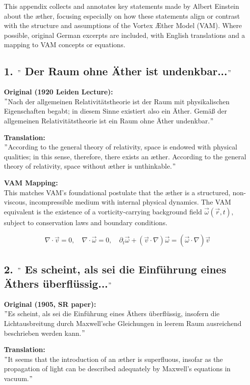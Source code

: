 This appendix collects and annotates key statements made by Albert Einstein about the æther, focusing especially on how these statements align or contrast with the structure and assumptions of the Vortex Æther Model (VAM). Where possible, original German excerpts are included, with English translations and a mapping to VAM concepts or equations.

\subsection*{1. \("\) Der Raum ohne Äther ist undenkbar...\("\)}
\textbf{Original (1920 Leiden Lecture):} \\
\("\)Nach der allgemeinen Relativitätstheorie ist der Raum mit physikalischen Eigenschaften begabt; in diesem Sinne existiert also ein Äther. Gemäß der allgemeinen Relativitätstheorie ist ein Raum ohne Äther undenkbar.\("\)

\textbf{Translation:} \\
\("\)According to the general theory of relativity, space is endowed with physical qualities; in this sense, therefore, there exists an æther. According to the general theory of relativity, space without æther is unthinkable.\("\)

\textbf{VAM Mapping:} \\
This matches VAM's foundational postulate that the æther is a structured, non-viscous, incompressible medium with internal physical dynamics. The VAM equivalent is the existence of a vorticity-carrying background field \( \vec{\omega}(\vec{r}, t) \), subject to conservation laws and boundary conditions.

\[
\nabla \cdot \vec{v} = 0, \quad \nabla \cdot \vec{\omega} = 0, \quad \partial_t \vec{\omega} + (\vec{v} \cdot \nabla) \vec{\omega} = (\vec{\omega} \cdot \nabla) \vec{v}
\]

\subsection*{2. \("\) Es scheint, als sei die Einführung eines Äthers überflüssig...\("\)}
\textbf{Original (1905, SR paper):} \\
\("\)Es scheint, als sei die Einführung eines Äthers überflüssig, insofern die Lichtausbreitung durch Maxwell'sche Gleichungen in leerem Raum ausreichend beschrieben werden kann.\("\)

\textbf{Translation:} \\
\("\)It seems that the introduction of an æther is superfluous, insofar as the propagation of light can be described adequately by Maxwell's equations in vacuum.\("\)

